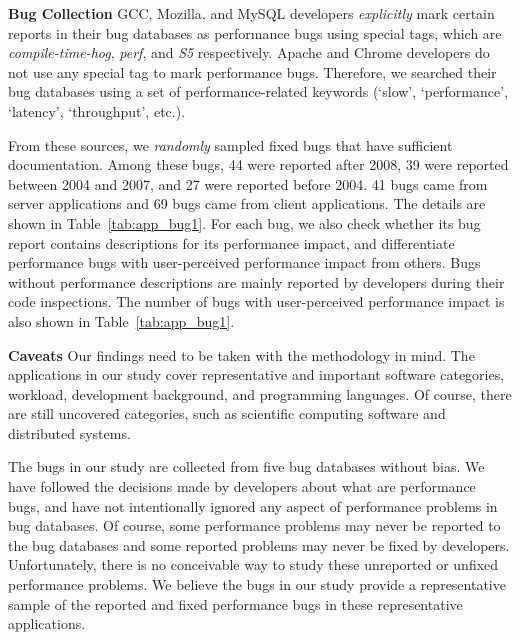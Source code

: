 {\bf Bug Collection}
GCC, Mozilla, and MySQL developers {\it explicitly} mark certain reports in
their bug databases as performance bugs using special tags, which are 
{\it compile-time-hog}, {\it perf}, and {\it S5} respectively.
Apache and Chrome developers do not use any special tag to mark performance 
bugs. Therefore, we searched their bug databases using
a set of performance-related keywords 
(`slow', `performance', `latency', 
`throughput', etc.).

From these sources, we {\it randomly} sampled \allbugs fixed bugs that
have sufficient documentation.
Among these bugs, 44 were reported after 2008, 39 were
reported between 2004 and 2007, and 27 were reported before 2004.
41 bugs came from server applications and 69 bugs came
from client applications. 
The details are shown in Table~\ref{tab:app_bug1}.
For each bug, we also check whether its bug report contains descriptions 
for its performance impact, and differentiate performance bugs with user-perceived performance impact from others. 
Bugs without performance descriptions are mainly reported by developers during their code inspections.
The number of bugs with user-perceived performance impact is also shown in Table~\ref{tab:app_bug1}.



{\bf Caveats}
Our findings need to be taken with the methodology in mind. 
The applications in our study cover representative and important software 
categories, workload, development background, and programming languages.
Of course, there are still uncovered categories, such as scientific
computing software and distributed systems.

The bugs in our study are collected from five bug databases without bias. 
We have followed the decisions made by developers about what are performance 
bugs,
and have not intentionally ignored any aspect of performance problems in bug
databases. Of course, some
performance problems may never be reported to the bug databases and some 
reported problems may never be fixed by developers.
Unfortunately, there is no conceivable way to study these unreported or
unfixed performance problems.
We believe the bugs in our study provide a representative sample of 
the reported and fixed performance bugs in these representative applications. 

